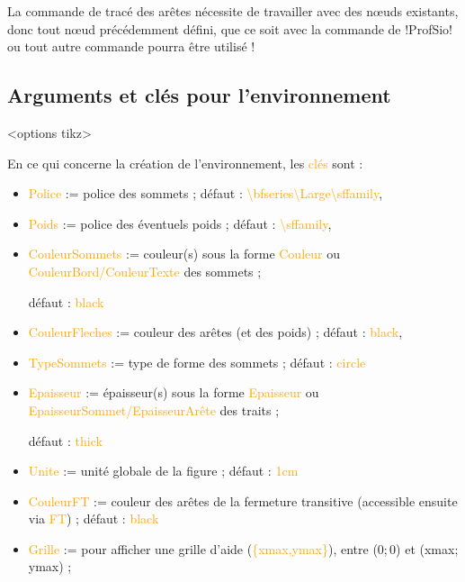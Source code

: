 \documentclass[french,a4paper,11pt]{article}
\newcommand\Cle[1]{{\small\sffamily\textlangle \textcolor{orange}{#1}\textrangle}}
\begin{document}
{{\begin{tipblock}
La commande de tracé des arêtes nécessite de travailler avec des nœuds existants, donc tout nœud précédemment défini, que ce soit avec la commande de \packagetex!ProfSio! ou tout autre commande pourra être utilisé !
\end{tipblock}

\subsection{Arguments et clés pour l'environnement}

\begin{DemoCode}
\begin{GrapheTikz}[clés]<options tikz>
\end{GrapheTikz}
\end{DemoCode}

\begin{tipblock}
En ce qui concerne la création de l'environnement, les \Cle{clés} sont :

\begin{itemize}
	\item \Cle{Police} := police des sommets ; \hfill{}défaut : \Cle{\textbackslash bfseries\textbackslash Large\textbackslash sffamily},%
	\item \Cle{Poids} := police des éventuels poids ; \hfill{}défaut : \Cle{\textbackslash sffamily},%
	\item \Cle{CouleurSommets} := couleur(s) sous la forme \Cle{Couleur} ou \Cle{CouleurBord/CouleurTexte} des sommets ;
	
	\hfill{}défaut : \Cle{black}
	\item \Cle{CouleurFleches} := couleur des arêtes (et des poids) ; \hfill{}défaut : \Cle{black},%
	\item \Cle{TypeSommets} := type de forme des sommets ; \hfill{}défaut : \Cle{circle}
	\item \Cle{Epaisseur} := épaisseur(s) sous la forme \Cle{Epaisseur} ou \Cle{EpaisseurSommet/EpaisseurArête} des traits ;
	
	\hfill{}défaut : \Cle{thick}
	\item \Cle{Unite} := unité globale de la figure ; \hfill{}défaut : \Cle{1cm}
	\item \Cle{CouleurFT} := couleur des arêtes de la fermeture transitive (accessible ensuite via \Cle{FT}) ; \hfill{}défaut : \Cle{black}
	\item \Cle{Grille} := pour afficher une grille d'aide (\Cle{\{xmax,ymax\}}), entre (0;\,0) et (xmax;\,ymax) ;
	

\end{itemize}
\end{tipblock}}}
\end{document}
